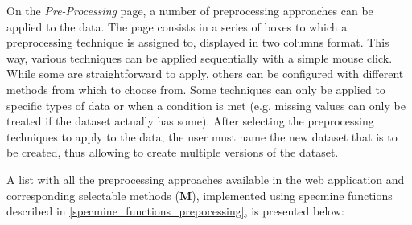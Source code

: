 On the \textit{Pre-Processing} page, a number of preprocessing approaches can be applied to the data. The page consists in a series of boxes to which a preprocessing technique is assigned to, displayed in two columns format. This way, various techniques can be applied sequentially with a simple mouse click. While some are straightforward to apply, others can be configured with different methods from which to choose from. Some techniques can only be applied to specific types of data or when a condition is met (e.g. missing values can only be treated if the dataset actually has some). After selecting the preprocessing techniques to apply to the data, the user must name the new dataset that is to be created, thus allowing to create multiple versions of the dataset.

A list with all the preprocessing approaches available in the web application and corresponding selectable methods (\textbf{M}), implemented using specmine functions described in \autoref{specmine_functions_prepocessing}, is presented below:


